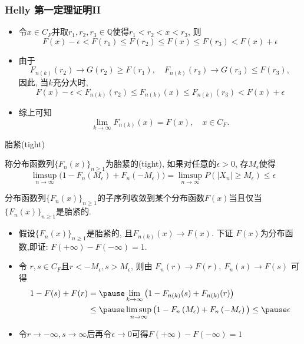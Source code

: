 \begin{frame}
	\frametitle{{\rm Helly} 第一定理证明II}


\begin{itemize}[<+-|alert@+>]

\item 令$x\in C_F$并取$r_1,r_2,r_3\in\mathbb{Q}$使得$r_{1}<r_{2}<x<r_3$, 则
	\[
	F(x)-\epsilon<F\left(r_{1}\right) \leq F\left(r_{2}\right) \leq F(x) \leq F(r_3)<F(x)+\epsilon
	\]
\item 由于
 \[ F_{n(k)}\left(r_{2}\right) \rightarrow G\left(r_{2}\right) \geq F\left(r_{1}\right), \quad  F_{n(k)}(r_3) \rightarrow G(r_3) \leq F(r_3), \]
 \pause 因此, 当$k$充分大时,
	\[
	F(x)-\epsilon<F_{n(k)}\left(r_{2}\right) \leq F_{n(k)}(x) \leq F_{n(k)}(r_3)<F(x)+\epsilon
	\]
	\item 综上可知
	\[\lim_{k \rightarrow \infty}F_{n(k)}(x) = F(x), \quad x\in C_F.\]
\end{itemize}
\end{frame}
\begin{frame}{胎紧(tight)}
\begin{defi}
  称分布函数列$\{F_n(x)\}_{n\geq 1}$为胎紧的(tight), 如果对任意的$\epsilon>0$, 存$M_{\epsilon}$使得
  \[
\limsup _{n \rightarrow \infty} \big(1-F_{n}\left(M_{\epsilon}\right)+F_{n}\left(-M_{\epsilon}\right) \big)=\limsup _{n \rightarrow \infty}P(|X_n|\geq M_{\epsilon})\leq \epsilon
\]
\end{defi}
\pause
\vspace{-0.5cm}
\begin{thm}
	分布函数列$\{F_n(x)\}_{n\geq 1}$的子序列收敛到某个分布函数$F(x)$当且仅当$\{F_n(x)\}_{n\geq 1}$是胎紧的.
 \end{thm}\pause

\zheng
\begin{itemize}[<+-|alert@+>]
\item 假设$\{F_n(x)\}_{n\geq 1}$是胎紧的, 且\( F_{n(k)}(x) \rightarrow F(x) \). 下证 $F(x)$为分布函数,\pause  即证: $F(+\infty)-F(-\infty)=1$.
\item 令 $r, s\in C_F$且\( r<-M_{\epsilon}, s>M_{\epsilon} \), 则由
\(F_{n}(r) \rightarrow F(r), \ F_{n}(s) \rightarrow F(s) \)
可得 \pause %
\[
\begin{aligned}
1-F(s)+F(r) & =\pause \lim _{k \rightarrow \infty} \big(1-F_{n(k)}(s)+F_{n(k)}(r) \big)\\
& \leq \pause \limsup _{n \rightarrow \infty} \big(1-F_{n}\left(M_{\epsilon}\right)+F_{n}\left(-M_{\epsilon}\right)\big) \leq \pause \epsilon
\end{aligned}
\]
\item 令$r\rightarrow-\infty, s\rightarrow\infty$后再令$\epsilon\rightarrow 0$可得$F(+\infty)-F(-\infty)=1$%
\end{itemize}


\end{frame}

